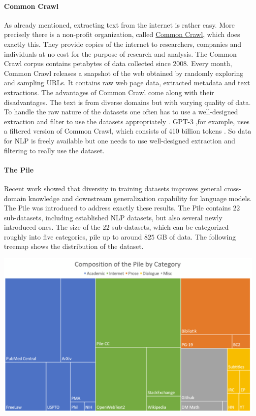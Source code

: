 \documentclass[
]{krantz}
\begin{document}
\hypertarget{common-crawl}{%
\paragraph{Common Crawl}\label{common-crawl}}

As already mentioned, extracting text from the internet is rather easy. More precisely there is a non-profit organization, called \href{https://commoncrawl.org}{Common Crawl}, which does exactly this. They provide copies of the internet to researchers, companies and individuals at no cost for the purpose of research and analysis. The Common Crawl corpus contains petabytes of data collected since 2008. Every month, Common Crawl releases a snapshot of the web obtained by randomly exploring and sampling URLs. It contains raw web page data, extracted metadata and text extractions. The advantages of Common Crawl come along with their disadvantages. The text is from diverse domains but with varying quality of data. To handle the raw nature of the datasets one often has to use a well-designed extraction and filter to use the datasets appropriately \citep{gao2020pile}. GPT-3 ,for example, uses a filtered version of Common Crawl, which consists of 410 billion tokens \citep{brown2020language}. So data for NLP is freely available but one needs to use well-designed extraction and filtering to really use the dataset.

\hypertarget{the-pile}{%
\paragraph{The Pile}\label{the-pile}}

Recent work \citep{rosset2020turing} showed that diversity in training datasets improves general cross-domain knowledge and downstream generalization capability for language models. The Pile \citep{gao2020pile} was introduced to address exactly these results. The Pile contains \(22\) sub-datasets, including established NLP datasets, but also several newly introduced ones. The size of the \(22\) sub-datasets, which can be categorized roughly into five categories, pile up to around \(825\) GB of data.
The following treemap shows the distribution of the dataset.

\includegraphics{figures/01-chapter1/thePile.png}
\end{document}
